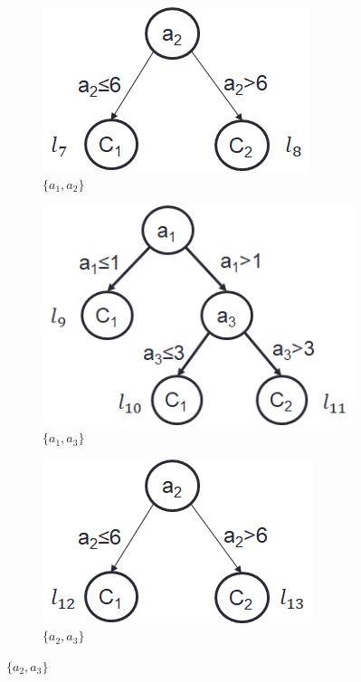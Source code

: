 \documentclass[letterpaper]{article}
\theoremstyle{definition}
\begin{document}
\begin{figure}[!t]
    \hspace{-10mm}
	\begin{subfigure}[t]{1in}\vskip 0pt
		\centering
		\caption{$\{a_1,a_2\}$}\label{fig:a1a2}
		\includegraphics[scale=0.4]{a1a2}
	\end{subfigure}
	\quad
	\begin{subfigure}[t]{1in}\vskip 0pt
		\centering
		\caption{$\{a_1,a_3\}$}\label{fig:a1a3}
		\includegraphics[scale=0.4]{a1a3}
	\end{subfigure}
	\quad
    \begin{subfigure}[t]{1in}\vskip 0pt
		\centering
		\caption{$\{a_2,a_3\}$}\label{fig:a2a3}
		\includegraphics[scale=0.4]{a2a3}
	\end{subfigure}
	\quad


\end{figure}
\end{document}

